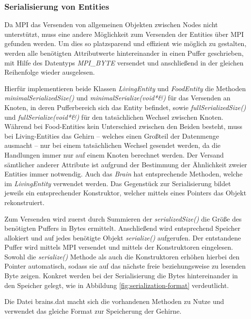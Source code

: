 \documentclass[course=erap]{aspdoc}
\begin{document}
\subsubsection{Serialisierung von Entities}
\label{sssec:serialisierung-entities}
Da MPI das Versenden von allgemeinen Objekten zwischen Nodes nicht unterstützt, muss eine andere Möglichkeit zum Versenden der Entities über MPI gefunden werden. Um dies so platzsparend und effizient wie möglich zu gestalten, werden alle benötigten Attributwerte hintereinander in einen Puffer geschrieben, mit Hilfe des Datentyps \emph{MPI\_BYTE} versendet und anschließend in der gleichen Reihenfolge wieder ausgelesen.

Hierfür implementieren beide Klassen \emph{LivingEntity} und \emph{FoodEntity} die Methoden \emph{minimalSerializedSize()} und \emph{minimalSerialize(void*\&)} für das Versenden an Knoten, in deren Pufferbereich sich das Entity befindet, sowie \emph{fullSerializedSize()} und \emph{fullSerialize(void*\&)} für den tatsächlichen Wechsel zwischen Knoten. Während bei Food-Entities kein Unterschied zwischen den Beiden besteht, muss bei Living-Entities das Gehirn -- welches einen Großteil der Datenmenge ausmacht -- nur bei einem tatsächlichen Wechsel gesendet werden, da die Handlungen immer nur auf einem Knoten berechnet werden. Der Versand sämtlicher anderer Attribute ist aufgrund der Bestimmung der Ähnlichkeit zweier Entities immer notwendig.
Auch das \emph{Brain} hat entsprechende Methoden, welche im \emph{LivingEntity} verwendet werden. Das Gegenstück zur Serialisierung bildet jeweils ein entsprechender Konstruktor, welcher mittels eines Pointers das Objekt rekonstruiert.

Zum Versenden wird zuerst durch Summieren der \emph{serializedSize()} die Größe des benötigten Puffers in Bytes ermittelt. Anschließend wird entsprechend Speicher allokiert und auf jedes benötigte Objekt \emph{serialize()} aufgerufen. Der entstandene Puffer wird mittels MPI versendet und mittels der Konstruktoren eingelesen. Sowohl die \emph{serialize()} Methode als auch die Konstruktoren erhöhen hierbei den Pointer automatisch, sodass sie auf das nächste freie beziehungsweise zu lesenden Byte zeigen.
Konkret werden bei der Serialisierung die Bytes hintereinander in den Speicher gelegt, wie in Abbildung \ref{fig:serialization-format} verdeutlicht.

Die Datei brains.dat macht sich die vorhandenen Methoden zu Nutze und verwendet das gleiche Format zur Speicherung der Gehirne.
\end{document}
